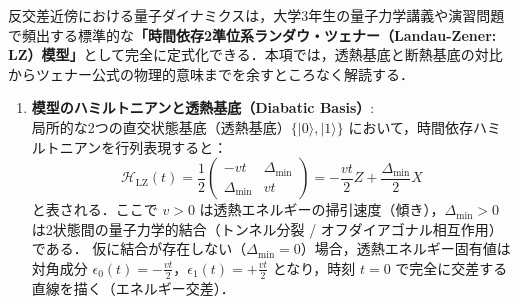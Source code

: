 \documentclass[11pt,a4paper,oneside,openany]{ltjsbook}
\theoremstyle{definition}
\theoremstyle{plain}
\theoremstyle{remark}
\newcommand{\ket}[1]{|#1\rangle}
\begin{document}
\begin{insightbox}
反交差近傍における量子ダイナミクスは，大学3年生の量子力学講義や演習問題で頻出する標準的な\textbf{「時間依存2準位系ランダウ・ツェナー（Landau-Zener: LZ）模型」}\cite{landau1932theorie,zener1932non}として完全に定式化できる．本項では，透熱基底と断熱基底の対比からツェナー公式の物理的意味までを余すところなく解読する．

\begin{enumerate}[label=\textbf{(\arabic*)}, leftmargin=*]
    \item \textbf{模型のハミルトニアンと透熱基底（Diabatic Basis）}:\\
    局所的な2つの直交状態基底（透熱基底）$\{\ket{0}, \ket{1}\}$ において，時間依存ハミルトニアンを行列表現すると：
    \begin{equation}
        \mathcal{H}_{\text{LZ}}(t) = \frac{1}{2}\begin{pmatrix} -v t & \Delta_{\min} \\ \Delta_{\min} & v t \end{pmatrix} = -\frac{v t}{2} Z + \frac{\Delta_{\min}}{2} X
    \end{equation}
    と表される．ここで $v > 0$ は透熱エネルギーの掃引速度（傾き），$\Delta_{\min} > 0$ は2状態間の量子力学的結合（トンネル分裂 / オフダイアゴナル相互作用）である．
    仮に結合が存在しない（$\Delta_{\min} = 0$）場合，透熱エネルギー固有値は対角成分 $\epsilon_0(t) = -\frac{vt}{2}$，$\epsilon_1(t) = +\frac{vt}{2}$ となり，時刻 $t=0$ で完全に交差する直線を描く（エネルギー交差）．


\end{enumerate}
\end{insightbox}
\end{document}
